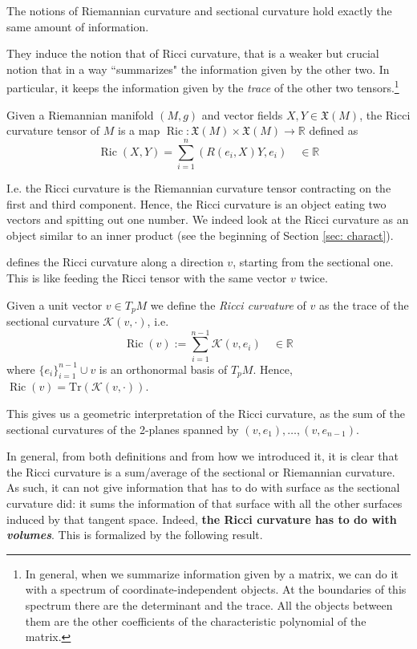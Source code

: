 \documentclass[a4paper,12pt,reqno]{amsbook}
\theoremstyle{definition} %
\newcommand{\1}{\mathbbm{1}}
\newcommand{\R}{\ensuremath{\mathbb{R}}}
\DeclareMathOperator{\Ric}{Ric}
\def\Ric{\mathop{\mathrm{Ric}}\nolimits}
\theoremstyle{plain}
\theoremstyle{remark}
\begin{document}
The notions of Riemannian curvature and sectional curvature hold exactly the same amount of information.

They induce the notion that of Ricci curvature, that is a weaker but crucial notion that in a way ``summarizes" the information given by the other two. In particular, it keeps the information given by the \emph{trace} of the other two tensors.\footnote{In general, when we summarize information given by a matrix, we can do it with a spectrum of coordinate-independent objects. At the boundaries of this spectrum there are the determinant and the trace. All the objects between them  are the other coefficients of the characteristic polynomial of the matrix.} 

\begin{definition}\label{def: ric}
    Given a Riemannian manifold $(M,g)$ and vector fields $X, Y \in \mathfrak{X}(M)$, the Ricci curvature tensor of $M$ is a map $\Ric: \mathfrak{X}(M) \times \mathfrak{X}(M) \to \R$ defined as
    \[
    \Ric(X,Y) = \sum_{i=1}^n (R(e_i, X)Y, e_i)  \quad \in \R
    \]

\end{definition}
I.e. the Ricci curvature is the Riemannian curvature tensor contracting on the first and third component. Hence, the Ricci curvature is an object eating two vectors and spitting out one number.  We indeed look at the Ricci curvature as an object similar to an inner product (see the beginning of Section \ref{sec: charact}). 

\cite{Ohta_2014} defines the Ricci curvature along a direction $v$, starting from the sectional one. This is like feeding the Ricci tensor with the same vector $v$ twice.

\begin{definition}
    Given a unit vector $v\in T_pM$ we define the \emph
    {Ricci curvature }of $v$ as the trace of the sectional curvature $\mathcal{K}(v, \cdot)$, i.e. 
    \[
    \Ric(v):=\sum_{i=1}^{n-1}\mathcal{K}(v,e_i) \quad \in \R
    \]
    where $\{e_i\}_{i=1}^{n-1} \cup v$ is an orthonormal basis of $T_pM$. Hence, $\Ric(v) = \text{Tr}(\mathcal{K}( v, \cdot))$. 
\end{definition}

This gives us a geometric interpretation of the Ricci curvature, as the sum of the sectional curvatures of the 2-planes spanned by $(v,e_1),\ldots,(v,e_{n-1})$. 

In general, from both definitions and from how we introduced it, it is clear that the Ricci curvature is a sum/average of the sectional or Riemannian curvature. As such, it can not give information that has to do with surface as the sectional curvature did: it sums the information of that surface with all the other surfaces induced by that tangent space. Indeed, \textbf{the Ricci curvature has to do with \emph{volumes}}. This is formalized by the following result.
\end{document}
